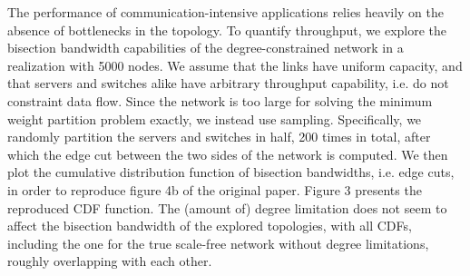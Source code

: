 The performance of communication-intensive applications relies heavily on the absence of bottlenecks in the topology. To quantify throughput, we explore the bisection bandwidth capabilities of the degree-constrained network in a realization with 5000 nodes. We assume that the links have uniform capacity, and that servers and switches alike have arbitrary throughput capability, i.e. do not constraint data flow. Since the network is too large for solving the minimum weight partition problem exactly, we instead use sampling. Specifically, we randomly partition the servers and switches in half, 200 times in total, after which the edge cut between the two sides of the network is computed. We then plot  the cumulative distribution function of bisection bandwidths, i.e.  edge cuts, in order to reproduce figure 4b of the original paper. Figure 3 presents the reproduced CDF function. The (amount of) degree limitation does not seem to affect the bisection bandwidth of the explored topologies, with all CDFs, including the one for the true scale-free network without degree limitations, roughly overlapping with each other.


